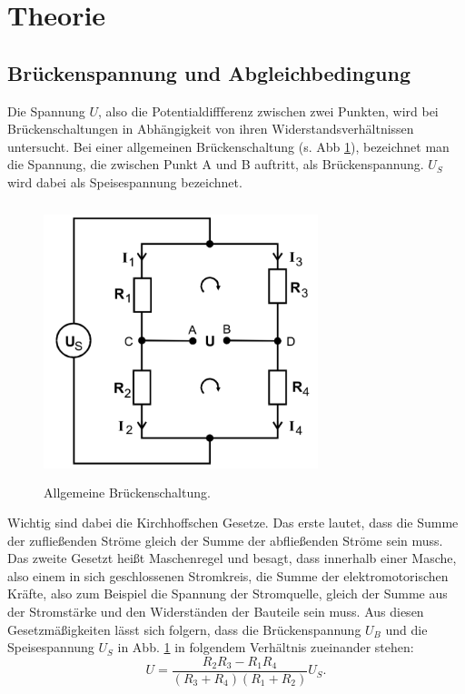 \section{Theorie}
\label{sec:Theorie}

\subsection{Brückenspannung und Abgleichbedingung}
Die Spannung $U$, also die Potentialdiffferenz zwischen zwei Punkten, wird bei Brückenschaltungen in Abhängigkeit von ihren 
Widerstandsverhältnissen untersucht.
Bei einer allgemeinen Brückenschaltung (s. Abb \ref{allgemein}), bezeichnet man die Spannung, die zwischen Punkt A und B auftritt, als Brückenspannung. 
$U_S$ wird dabei als Speisespannung bezeichnet.
\begin{figure}
    \centering
    \includegraphics[width=8cm, height=8cm]{build/allgemein.png}
    \caption{Allgemeine Brückenschaltung.}
    \label{allgemein}
\end{figure}
\noindent Wichtig sind dabei die Kirchhoffschen Gesetze. 
Das erste lautet, dass die Summe der zufließenden Ströme gleich der Summe der abfließenden Ströme sein muss. 
Das zweite Gesetzt heißt Maschenregel und besagt, dass innerhalb einer Masche, also einem in sich geschlossenen Stromkreis, die Summe der 
elektromotorischen Kräfte, also zum Beispiel die Spannung der Stromquelle, gleich der Summe aus %
der Stromstärke und den Widerständen der Bauteile sein muss. 
\newline
Aus diesen Gesetzmäßigkeiten lässt sich folgern, dass die Brückenspannung $U_B$ und die Speisespannung $U_S$ in Abb. \ref{allgemein} in folgendem Verhältnis 
zueinander stehen:
\begin{equation*}
    U = \frac{R_2R_3 - R_1R_4}{(R_3 + R_4)(R_1 + R_2)}U_S.
\end{equation*}

